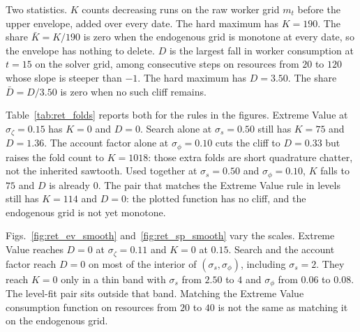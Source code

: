 Two statistics. $K$ counts decreasing runs on the raw worker grid $m_t$ before the
upper envelope, added over every date. The hard maximum has $K = 190$. The share
$\bar K = K/190$ is zero when the endogenous grid is monotone at every date, so the
envelope has nothing to delete. $D$ is the largest fall in worker consumption at
$t = 15$ on the solver grid, among consecutive steps on resources from $20$ to $120$
whose slope is steeper than $-1$. The hard maximum has $D = 3.50$. The share
$\bar D = D/3.50$ is zero when no such cliff remains.

Table~\ref{tab:ret_folds} reports both for the rules in the figures. Extreme Value
at $\sigma_\zeta = 0.15$ has $K = 0$ and $D = 0$. Search alone at $\sigma_s = 0.50$
still has $K = 75$ and $D = 1.36$. The account factor alone at $\sigma_\phi = 0.10$
cuts the cliff to $D = 0.33$ but raises the fold count to $K = 1018$: those extra
folds are short quadrature chatter, not the inherited sawtooth. Used together at
$\sigma_s = 0.50$ and $\sigma_\phi = 0.10$, $K$ falls to $75$ and $D$ is already $0$.
The pair that matches the Extreme Value rule in levels still has $K = 114$ and
$D = 0$: the plotted function has no cliff, and the endogenous grid is not yet
monotone.

Figs.~\ref{fig:ret_ev_smooth} and~\ref{fig:ret_sp_smooth} vary the scales.
Extreme Value reaches $D = 0$ at $\sigma_\zeta = 0.11$ and $K = 0$ at $0.15$.
Search and the account factor reach $D = 0$ on most of the interior of
$(\sigma_s, \sigma_\phi)$, including $\sigma_s = 2$. They reach $K = 0$ only in a
thin band with $\sigma_s$ from $2.50$ to $4$ and $\sigma_\phi$ from $0.06$ to
$0.08$. The level-fit pair sits outside that band. Matching the Extreme Value
consumption function on resources from $20$ to $40$ is not the same as matching
it on the endogenous grid.

